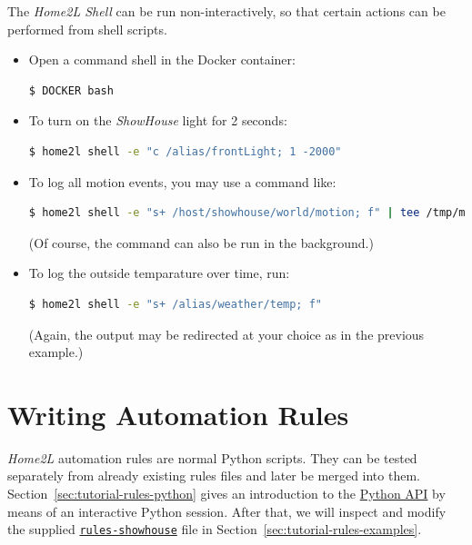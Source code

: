 \documentclass[12pt,english,parskip=half,headheight=19pt]{scrreprt}
\newcommand{\idx}[1]{#1\index{#1}}
\newcommand{\reftool}[1]{\hyperref[tool:#1]{\texttt{\idx{#1}}}}
\newcommand{\refdoc}[2]{\href{#1}{#2}}              %
\newcommand{\theapipython}{\refdoc{home2l-api_python/index.html}{Python API}}
\begin{document}
The \textit{Home2L Shell} can be run non-interactively, so that certain actions can be performed from shell scripts.

\begin{itemize}[$\blacktriangleright$]

\item
  Open a command shell in the Docker container:
  \begin{lstlisting}[language=bash]
    $ DOCKER bash
  \end{lstlisting}

\item
  To turn on the \textit{ShowHouse} light for 2 seconds:
  \begin{lstlisting}[language=bash]
    $ home2l shell -e "c /alias/frontLight; 1 -2000"
  \end{lstlisting}

\item
  To log all motion events, you may use a command like:
  \begin{lstlisting}[language=bash]
    $ home2l shell -e "s+ /host/showhouse/world/motion; f" | tee /tmp/motion.log
  \end{lstlisting}
  (Of course, the command can also be run in the background.)

\item
  To log the outside temparature over time, run:
  \begin{lstlisting}[language=bash]
    $ home2l shell -e "s+ /alias/weather/temp; f"
  \end{lstlisting}
  (Again, the output may be redirected at your choice as in the previous example.)

\end{itemize}





\clearpage
\section{Writing Automation Rules}
\label{sec:tutorial-rules}


\textit{Home2L} automation rules are normal Python scripts.
They can be tested separately from already existing rules files and later be merged into them.
Section~\ref{sec:tutorial-rules-python} gives an introduction to the \theapipython{} by
means of an interactive Python session.
After that, we will inspect and modify the supplied \reftool{rules-showhouse} file in Section~\ref{sec:tutorial-rules-examples}.
\end{document}
